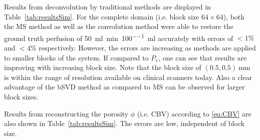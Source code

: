 \documentclass[journal,twocolumn]{IEEEtran}
\newcommand{\Perfv}{P_{\mathrm{v}}}
\newcommand{\siPml}{\milli\litre\per\minute\per100\milli\litre}
\begin{document}
	Results from deconvolution by traditional methods are displayed in Table~\ref{tab:resultsSim}. 
	For the complete domain (i.e. block size $64 \times 64$), both the MS method as well as the convolution method were able to restore the ground truth perfusion of \SI{50}{\siPml} accurately with errors of $<1\%$ and $<4\%$ respectively.
	However, the errors are increasing as methods are applied to smaller blocks of the system.
	If compared to $\Perfv$, one can see that results are improving with increasing block size. 
	Note that the block size of $(0.5,0.5)\SI{}{\milli\meter}$ is within the range of resolution available on clinical scanners today. %
	Also a clear advantage of the bSVD method as compared to MS can be observed for larger block sizes.

	Results from reconstructing the porosity $\phi$ (i.e. CBV) according to \eqref{eq:CBV} are also shown in Table~\ref{tab:resultsSim}. The errors are low, independent of block size.
\end{document}
